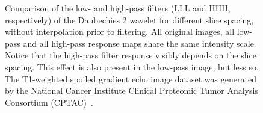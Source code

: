 \documentclass[fleqn,a4paper,oneside,openany]{book}
\begin{document}
\begin{figure}
\begin{minipage}[b]{140pt}
     \label{fig:radiomics_filter_5mm_high_pass}
     \hspace{100pt}
   \end{minipage}
  \caption{Comparison of the low- and high-pass filters (LLL and HHH, respectively) of the Daubechies 2 wavelet for different slice spacing, without interpolation prior to filtering. All original images, all low-pass and all high-pass response maps share the same intensity scale. Notice that the high-pass filter response visibly depends on the slice spacing. This effect is also present in the low-pass image, but less so. The T1-weighted spoiled gradient echo image dataset was generated by the National Cancer Institute Clinical Proteomic Tumor Analysis Consortium (CPTAC)~\cite{CPTAC2018-ot,Clark2013-sv}.
  }
  \label{fig:radiomics_filter_before_interpolation}
\end{figure}
\end{document}
